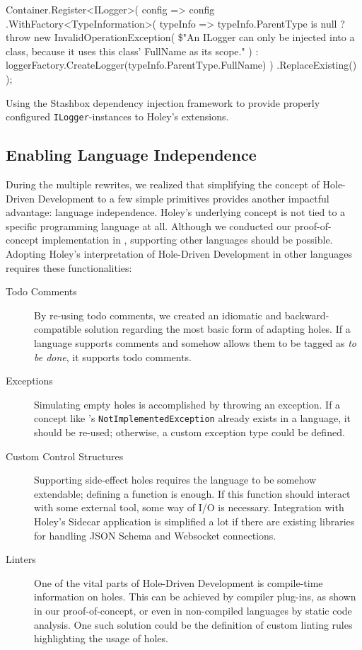 \begin{program}[ht]
\begin{CsCode}
Container.Register<ILogger>(
	config =>
		config
			.WithFactory<TypeInformation>(
				typeInfo =>
					typeInfo.ParentType is null
						? throw new InvalidOperationException(
							\$"An ILogger can only be injected into a class, because it uses this class' FullName as its scope."
						)
						: loggerFactory.CreateLogger(typeInfo.ParentType.FullName)
			)
			.ReplaceExisting()
);
\end{CsCode}
\caption{Using the Stashbox dependency injection framework to provide properly configured \texttt{ILogger}-instances to Holey's extensions.}
\label{prg:holey-supporting-logging}
\end{program}

\subsection{Enabling Language Independence}
\label{sec:holey-enabling-language-independence}
During the multiple rewrites, we realized that simplifying the concept of Hole-Driven Development to a few simple primitives provides another impactful advantage: language independence.
Holey's underlying concept is not tied to a specific programming language at all.
Although we conducted our proof-of-concept implementation in \CS, supporting other languages should be possible.
Adopting Holey's interpretation of Hole-Driven Development in other languages requires these functionalities:

\begin{description}
    \item[Todo Comments] By re-using todo comments, we created an idiomatic and backward-compatible solution regarding the most basic form of adapting holes. If a language supports comments and somehow allows them to be tagged as \emph{to be done}, it supports todo comments.
    \item[Exceptions] Simulating empty holes is accomplished by throwing an exception. If a concept like \CS's \verb|NotImplementedException| already exists in a language, it should be re-used; otherwise, a custom exception type could be defined.
    \item[Custom Control Structures] Supporting side-effect holes requires the language to be somehow extendable; defining a function is enough. If this function should interact with some external tool, some way of I/O is necessary. Integration with Holey's Sidecar application is simplified a lot if there are existing libraries for handling JSON Schema and Websocket connections.
    \item[Linters] One of the vital parts of Hole-Driven Development is compile-time information on holes. This can be achieved by compiler plug-ins, as shown in our proof-of-concept, or even in non-compiled languages by static code analysis. One such solution could be the definition of custom linting rules highlighting the usage of holes.
\end{description}

